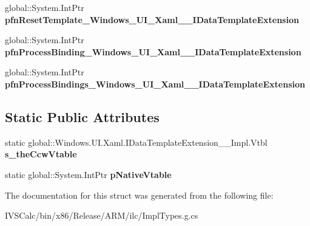 \begin{DoxyCompactItemize}
global\+::\+System.\+Int\+Ptr {\bfseries pfn\+Reset\+Template\+\_\+\+Windows\+\_\+\+U\+I\+\_\+\+Xaml\+\_\+\+\_\+\+I\+Data\+Template\+Extension}
\item 
\mbox{\label{struct_windows_1_1_u_i_1_1_xaml_1_1_i_data_template_extension_____impl_1_1_vtbl_a020c2081ce64efc42a1f433a7830c5be}} 
global\+::\+System.\+Int\+Ptr {\bfseries pfn\+Process\+Binding\+\_\+\+Windows\+\_\+\+U\+I\+\_\+\+Xaml\+\_\+\+\_\+\+I\+Data\+Template\+Extension}
\item 
\mbox{\label{struct_windows_1_1_u_i_1_1_xaml_1_1_i_data_template_extension_____impl_1_1_vtbl_a82b2ea89b1be994351f07e58b8c10add}} 
global\+::\+System.\+Int\+Ptr {\bfseries pfn\+Process\+Bindings\+\_\+\+Windows\+\_\+\+U\+I\+\_\+\+Xaml\+\_\+\+\_\+\+I\+Data\+Template\+Extension}
\end{DoxyCompactItemize}
\subsection*{Static Public Attributes}
\begin{DoxyCompactItemize}
\item 
\mbox{\label{struct_windows_1_1_u_i_1_1_xaml_1_1_i_data_template_extension_____impl_1_1_vtbl_a71e442afe3fe851ec1911a10fc1c33a5}} 
static global\+::\+Windows.\+U\+I.\+Xaml.\+I\+Data\+Template\+Extension\+\_\+\+\_\+\+Impl.\+Vtbl {\bfseries s\+\_\+the\+Ccw\+Vtable}
\item 
\mbox{\label{struct_windows_1_1_u_i_1_1_xaml_1_1_i_data_template_extension_____impl_1_1_vtbl_ad8a95cf2631d0ac68fd70489969abff7}} 
static global\+::\+System.\+Int\+Ptr {\bfseries p\+Native\+Vtable}
\end{DoxyCompactItemize}


The documentation for this struct was generated from the following file\+:\begin{DoxyCompactItemize}
\item 
I\+V\+S\+Calc/bin/x86/\+Release/\+A\+R\+M/ilc/Impl\+Types.\+g.\+cs\end{DoxyCompactItemize}
